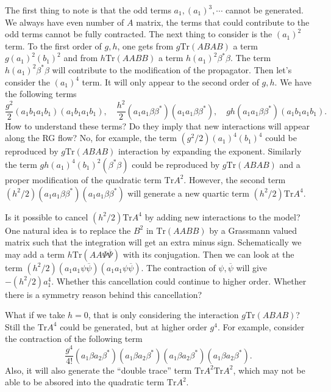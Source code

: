The first thing to note is that the odd terms $a_1,(a_1)^3,\cdots$ cannot be generated.
We always have even number of $A$ matrix, the terms that could contribute to the odd terms cannot be fully contracted.
The next thing to consider is the $(a_1)^2$ term.
To the first order of $g,h$, one gets from $g\mathrm{Tr}(ABAB)$ a term $g (a_1)^2 (b_1)^2$ and from $h\mathrm{Tr}(AABB)$ a term $h(a_1)^2 \beta^* \beta$.
The term $h (a_1)^2 \beta^* \beta$ will contribute to the modification of the propagator.
Then let's consider the $(a_1)^4$ term.
It will only appear to the second order of $g,h$.
We have the following terms
\[
	\frac{g^2}{2} (a_1 b_1 a_1 b_1)(a_1 b_1 a_1 b_1),\quad \frac{h^2}{2} (a_1 a_1 \beta \beta^*)(a_1 a_1 \beta \beta^*),\quad gh(a_1 a_1 \beta \beta^*)(a_1 b_1 a_1 b_1) 
.\] 
How to understand these terms?
Do they imply that new interactions will appear along the RG flow?
No, for example, the term $(g^2/2) (a_1)^4 (b_1)^4$ could be reproduced by $g \mathrm{Tr}(ABAB)$ interaction by expanding the exponent.
Similarly the term $ gh (a_1)^4 (b_1)^2 (\beta^* \beta)$ could be reproduced by $ g \mathrm{Tr}(ABAB)$ and a proper modification of the quadratic term $ \mathrm{Tr}A^2$.
However, the second term $ (h^2 / 2) (a_1 a_1 \beta \beta^*) (a_1 a_1 \beta \beta^*) $ will generate a new quartic term $(h^2 / 2)\mathrm{Tr}A^4$.

Is it possible to cancel $ ( h^2 / 2) \mathrm{Tr} A^4$ by adding new interactions to the model?
One natural idea is to replace the $B^2$ in $ \mathrm{Tr}(AABB) $ by a Grassmann valued matrix such that the integration will get an extra minus sign.
Schematically we may add a term $h\mathrm{Tr}(AA\Psi \overline{\Psi})$ with its conjugation. 
Then we can look at the term $ (h^2 / 2) (a_1 a_1 \psi \overline{\psi}) (a_1 a_1 \psi \overline{\psi})$.
The contraction of $\psi,\overline{\psi}$ will give $ - (h^2 /2) a_1^4 $.
Whether this cancellation could continue to higher order.
Whether there is a symmetry reason behind this cancellation?

What if we take $h=0$, that is only considering the interaction $ g \mathrm{Tr}(ABAB)$?
Still the $\mathrm{Tr}A^4$ could be generated, but at higher order $g^4$.
For example, consider the contraction of the following term
\[
	\frac{g^4}{4!}(a_1 \beta a_2 \beta^*)(a_1 \beta a_2 \beta^*)(a_1 \beta a_2 \beta^*)(a_1 \beta a_2 \beta^*)
.\] 
Also, it will also generate the ``double trace'' term $ \mathrm{Tr}A^2 \mathrm{Tr}A^2$, which may not be able to be absored into the quadratic term $\mathrm{Tr}A^2$.

